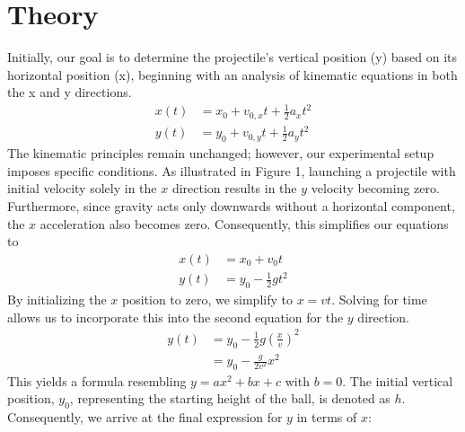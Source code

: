 \documentclass{report}
\begin{document}
    \section{Theory}
    \bigbreak \noindent 
    \begin{figure}[ht]
        \centering
        \label{fig:fig1}
    \end{figure}
    \bigbreak \noindent 
    Initially, our goal is to determine the projectile's vertical position (y) based on its horizontal position (x), beginning with an analysis of kinematic equations in both the x and y directions.
    \begin{equation}
        \begin{split}
            x(t) &= x_{0} + v_{0,x}t + \frac{1}{2}a_{x}t^{2}  \\
            y(t) &= y_{0} + v_{0,y}t + \frac{1}{2}a_{y}t^{2} 
        \end{split}
    \end{equation}
    \bigbreak \noindent 
    The kinematic principles remain unchanged; however, our experimental setup imposes specific conditions. As illustrated in Figure 1, launching a projectile with initial velocity solely in the $x$ direction results in the $y$ velocity becoming zero. Furthermore, since gravity acts only downwards without a horizontal component, the $x$ acceleration also becomes zero. Consequently, this simplifies our equations to
    \bigbreak \noindent 
    \begin{equation}
        \begin{split}
            x(t) &= x_{0} + v_{0}t \\
            y(t)&=y_{0} -\frac{1}{2}gt^{2}
        \end{split}
    \end{equation}
    \bigbreak \noindent 
    By initializing the $x$ position to zero, we simplify to $x = vt$. Solving for time allows us to incorporate this into the second equation for the $y$ direction.
    \begin{equation}
        \begin{split}
            y(t) &= y_{0} -\frac{1}{2}g\left(\frac{x}{v}\right)^{2}  \\
            &=y_{0}  - \frac{g}{2v^{2}}x^{2}
        \end{split}
    \end{equation}
    \bigbreak \noindent 
    This yields a formula resembling $y = ax^2 + bx + c$ with $b = 0$. The initial vertical position, $y_0$, representing the starting height of the ball, is denoted as $h$. Consequently, we arrive at the final expression for $y$ in terms of $x$:
\end{document}
